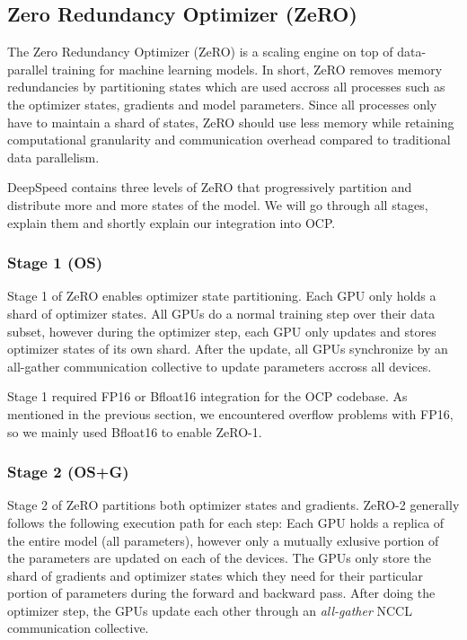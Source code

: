 \subsection{Zero Redundancy Optimizer (ZeRO)}
\label{subsection:zero}

The Zero Redundancy Optimizer (ZeRO) is a scaling engine on top of data-parallel training for 
machine learning models. In short, ZeRO removes memory redundancies by partitioning states which 
are used accross all processes such as the optimizer states, gradients and model parameters. 
Since all processes only have to maintain a shard of states, ZeRO should use less memory while 
retaining computational granularity and communication overhead compared to traditional data 
parallelism.

DeepSpeed contains three levels of ZeRO that progressively partition and distribute more and 
more states of the model. We will go through all stages, explain them and shortly explain our 
integration into OCP.



\subsubsection{Stage 1 (OS)}

Stage 1 of ZeRO enables optimizer state partitioning. Each GPU only holds a shard of optimizer states.
All GPUs do a normal training step over their data subset, however during the optimizer step, each 
GPU only updates and stores optimizer states of its own shard. After the update, all GPUs synchronize 
by an all-gather communication collective to update parameters accross all devices.

Stage 1 required FP16 or Bfloat16 integration for the OCP codebase. As mentioned in the previous 
section, we encountered overflow problems with FP16, so we mainly used Bfloat16 to enable ZeRO-1.

\subsubsection{Stage 2 (OS+G)}

Stage 2 of ZeRO partitions both optimizer states and gradients. ZeRO-2 generally follows the following 
execution path for each step: Each GPU holds a replica of the entire model (all parameters), however 
only a mutually exlusive portion of the parameters are updated on each of the devices. The GPUs only store 
the shard of gradients and optimizer states which they need for their particular portion of parameters 
during the forward and backward pass. After doing the optimizer step, the GPUs update each other through 
an \textit{all-gather} NCCL communication collective. 

